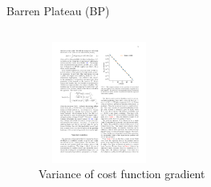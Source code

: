 \documentclass[dvipdfmx,10pt,aspectratio=169]{beamer}
\begin{document}
\begin{frame}{Barren Plateau (BP)}
\begin{columns}
\begin{column}{0.35\textwidth}
            \begin{figure}
                \centering
                \includegraphics[height=4cm,width=4cm]{bp-var.pdf}
                \vspace*{-5pt}
                \caption{Variance of cost function gradient}
            \end{figure}
        \end{column}
    \end{columns}
\end{frame}
\end{document}
